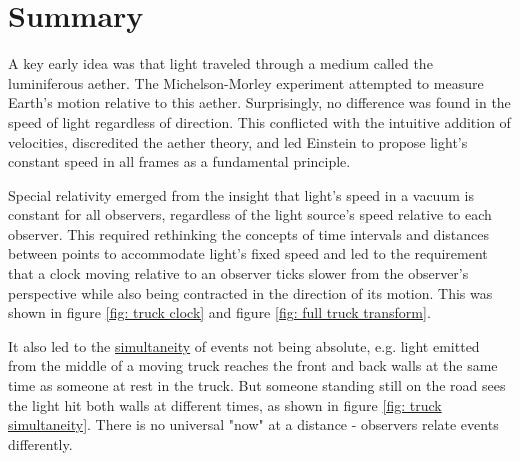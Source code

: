 


\section{Summary}

A key early idea was that light traveled through a medium called the luminiferous aether. The Michelson-Morley experiment attempted to measure Earth's motion relative to this aether. Surprisingly, no difference was found in the speed of light regardless of direction. This conflicted with the intuitive addition of velocities, discredited the aether theory, and led Einstein to propose light's constant speed in all frames as a fundamental principle.

Special relativity emerged from the insight that light's speed in a vacuum is constant for all observers, regardless of the light source's speed relative to each observer. This required rethinking the concepts of time intervals and distances between points to accommodate light's fixed speed and led to the requirement that a clock moving relative to an observer ticks slower from the observer's perspective while also being contracted in the direction of its motion. This was shown in figure \ref{fig: truck clock} and figure \ref{fig: full truck transform}.

It also led to the \hyperlink{def-simultaneity}{simultaneity} of events not being absolute, e.g. light emitted from the middle of a moving truck reaches the front and back walls at the same time as someone at rest in the truck. But someone standing still on the road sees the light hit both walls at different times, as shown in figure \ref{fig: truck simultaneity}. There is no universal "now" at a distance - observers relate events differently.

